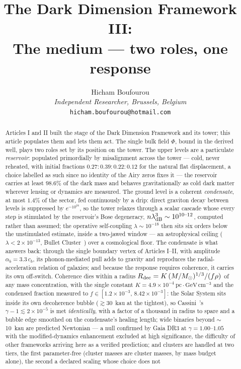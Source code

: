 
\graphicspath{{figures/}{../figures/}}
\title{\textbf{The Dark Dimension Framework III:\\ The medium --- two roles, one response}}
\author{Hicham Boufourou\\ \small\textit{Independent Researcher, Brussels, Belgium}\\ \small\texttt{hicham.boufourou@hotmail.com}}
\newcommand{\Msun}{M_{\odot}}
\maketitle
\begin{abstract}
\noindent Articles I and II built the stage of the Dark Dimension Framework and its tower; this article populates them and lets them act. The single bulk field $\Phi$, bound in the derived well, plays two roles set by its position on the tower. The upper levels are a particulate \emph{reservoir}: populated primordially by misalignment across the tower --- cold, never reheated, with initial fractions $0.27{:}0.39{:}0.22{:}0.12$ for the natural flat displacement, a choice labelled as such since no identity of the Airy zeros fixes it --- the reservoir carries at least $98.6\%$ of the dark mass and behaves gravitationally as cold dark matter wherever lensing or dynamics are measured. The ground level is a coherent \emph{condensate}, at most $1.4\%$ of the sector, fed continuously by a drip: direct graviton decay between levels is suppressed by $e^{-10^{24}}$, so the tower relaxes through a scalar cascade whose every step is stimulated by the reservoir's Bose degeneracy, $n\lambda_{\rm dB}^{3}\sim10^{10\text{--}12}$, computed rather than assumed; the operative self-coupling $\lambda\sim10^{-18}$ then sits six orders below the unstimulated estimate, inside a two-jawed window --- an astrophysical ceiling ($\lambda<2\times10^{-13}$, Bullet Cluster~\cite{Clowe}) over a cosmological floor. The condensate is what answers back: through the single boundary vertex of Articles I--II, with amplitude $\alpha_{b}=3.3\,c_{b}$, its phonon-mediated pull adds to gravity and reproduces the radial-acceleration relation of galaxies; and because the response requires coherence, it carries its own off-switch. Coherence dies within a radius $R_{\rm dec}=K\,(M/\Msun)^{1/3}/(f\rho)$ of any mass concentration, with the single constant $K=4.9\times10^{-4}~\mathrm{pc\cdot GeV\,cm^{-3}}$ and the condensed fraction measured to $f\in[1.2\times10^{-3},\,8.42\times10^{-3}]$: the Solar System sits inside its own decoherence bubble ($\gtrsim$30~kau at the tightest), so Cassini~\cite{Bertotti}'s $\gamma-1\lesssim2\times10^{-5}$ is met \emph{identically}, with a factor of a thousand in radius to spare and a bubble edge smoothed on the condensate's healing length; wide binaries beyond $\sim$10~kau are predicted Newtonian --- a null confirmed by Gaia DR3 at $\gamma=1.00$--$1.05$ with the modified-dynamics enhancement excluded at high significance, the difficulty of other frameworks arriving here as a verified prediction; and clusters are handled at two tiers, the first parameter-free (cluster masses are cluster masses, by mass budget alone), the second a declared scaling whose choice does not 
\end{abstract}
